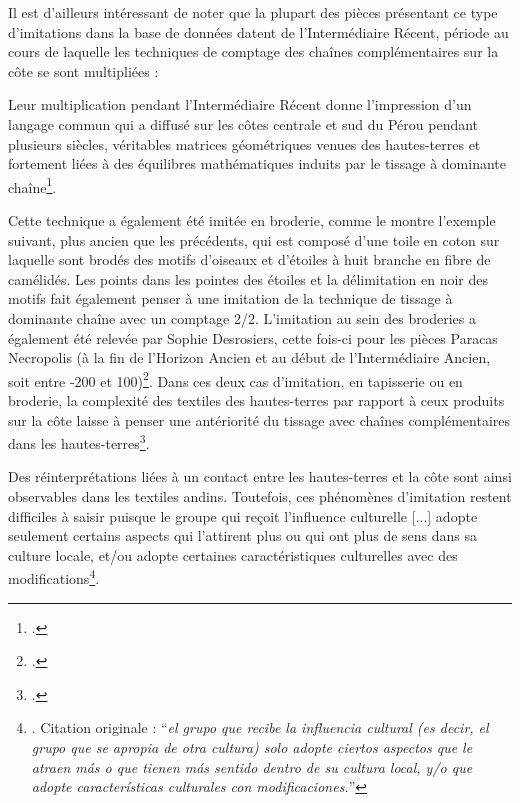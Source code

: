 Il est d'ailleurs intéressant de noter que la plupart des pièces présentant ce type d'imitations dans la base de données datent de l'Intermédiaire Récent, période au cours de laquelle les techniques de comptage des chaînes complémentaires sur la côte se sont multipliées : 
\begin{citer}
Leur multiplication pendant l'Intermédiaire Récent donne l'impression d'un langage commun qui a diffusé sur les côtes centrale et sud du Pérou pendant plusieurs siècles, véritables matrices géométriques venues des hautes-terres et fortement liées à des équilibres mathématiques induits par le tissage à dominante chaîne\footcite[p.~61]{desrosiersMatieresPremieresSavoirs2018}.
\end{citer}

\noindent Cette technique a également été imitée en broderie, comme le montre l'exemple suivant, plus ancien que les précédents, qui est composé d'une toile en coton sur laquelle sont brodés des motifs d'oiseaux et d'étoiles à huit branche en fibre de camélidés. Les points dans les pointes des étoiles et la délimitation en noir des motifs fait également penser à une imitation de la technique de tissage à dominante chaîne avec un comptage 2/2. L'imitation au sein des broderies a également été relevée par Sophie Desrosiers, cette fois-ci pour les pièces Paracas Necropolis (à la fin de l'Horizon Ancien et au début de l'Intermédiaire Ancien, soit entre -200 et 100)\footcite[p.~2]{desrosiersReexamenTuniqueOcucaje2010}. Dans ces deux cas d'imitation, en tapisserie ou en broderie, la complexité des textiles des hautes-terres par rapport à ceux produits sur la côte laisse à penser une antériorité du tissage avec chaînes complémentaires dans les hautes-terres\footcite[p.~8]{desrosiersHighlandComplementaryWarpWeaving2014}. 

Des réinterprétations liées à un contact entre les hautes-terres et la côte sont ainsi observables dans les textiles andins. Toutefois, ces phénomènes d'imitation restent difficiles à saisir puisque \og le groupe qui reçoit l'influence culturelle [...] adopte seulement certains aspects qui l'attirent plus ou qui ont plus de sens dans sa culture locale, et/ou adopte certaines caractéristiques culturelles avec des modifications\footnote{\cite[p.~10]{youngMontanaMarIntercambio2017}. Citation originale : \textquotedblleft \textit{el grupo que recibe la influencia cultural (es decir, el grupo que se apropia de otra cultura) solo adopte ciertos aspectos que le atraen más o que tienen más sentido dentro de su cultura local, y/o que adopte características culturales con modificaciones.}\textquotedblright}.\fg 

